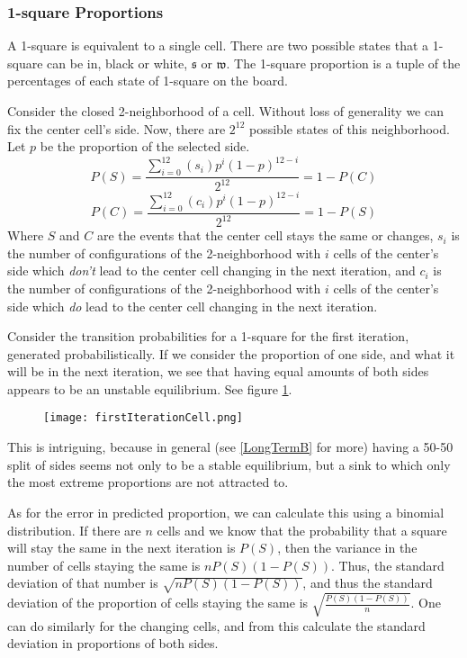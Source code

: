 \documentclass[12pt]{article}
\theoremstyle{definition}
\theoremstyle{remark}
\theoremstyle{remark}
\begin{document}
\subsubsection{1-square Proportions}
\par
A 1-square is equivalent to a single cell. There are two possible states that a 1-square can be in, black or white, $\mathfrak{s}$ or $\mathfrak{w}$. The 1-square proportion is a tuple of the percentages of each state of 1-square on the board.
\par
Consider the closed 2-neighborhood of a cell. Without loss of generality we can fix the center cell's side. Now, there are $2^{12}$ possible states of this neighborhood. Let $p$ be the proportion of the selected side.
\begin{equation}
P(S)=\frac{\sum^{12}_{i=0}{\left( s_i \right)p^i \left(1-p\right)^{12-i}}}{2^{12}}=1-P(C)
\end{equation}
\begin{equation}
P(C)=\frac{\sum^{12}_{i=0}{\left( c_i \right)p^i \left(1-p\right)^{12-i}}}{2^{12}}=1-P(S)
\end{equation}
Where $S$ and $C$ are the events that the center cell stays the same or changes, $s_i$ is the number of configurations of the 2-neighborhood with $i$ cells of the center's side which \emph{don't} lead to the center cell changing in the next iteration, and $c_i$ is the number of configurations of the 2-neighborhood with $i$ cells of the center's side which \emph{do} lead to the center cell changing in the next iteration.

\par
Consider the transition probabilities for a 1-square for the first iteration, generated probabilistically. If we consider the proportion of one side, and what it will be in the next iteration, we see that having equal amounts of both sides appears to be an unstable equilibrium. See figure \ref{fig:cellFirst}.
\begin{figure}
	\centering
	\texttt{[image: firstIterationCell.png]}
	\caption{}
	\label{fig:cellFirst}
\end{figure}
\par 
This is intriguing, because in general (see \ref{LongTermB} for more) having a 50-50 split of sides seems not only to be a stable equilibrium, but a sink to which only the most extreme proportions are not attracted to.
\par
As for the error in predicted proportion, we can calculate this using a binomial distribution. If there are $n$ cells and we know that the probability that a square will stay the same in the next iteration is $P(S)$, then the variance in the number of cells staying the same is $nP(S)(1-P(S))$. Thus, the standard deviation of that number is $\sqrt{nP(S)(1-P(S))}$, and thus the standard deviation of the proportion of cells staying the same is $\sqrt{\frac{P(S)(1-P(S))}{n}}$. One can do similarly for the changing cells, and from this calculate the standard deviation in proportions of both sides.
\end{document}
